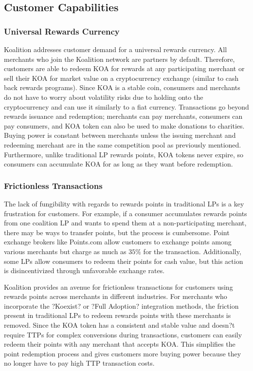 \subsection{Customer Capabilities}

\subsubsection{Universal Rewards Currency}
Koalition addresses customer demand for a universal rewards currency. All merchants who join the Koalition network are partners by default. Therefore, customers are able to redeem KOA for rewards at any participating merchant or sell their KOA for market value on a cryptocurrency exchange (similar to cash back rewards programs). Since KOA is a stable coin, consumers and merchants do not have to worry about volatility risks due to holding onto the cryptocurrency and can use it similarly to a fiat currency. Transactions go beyond rewards issuance and redemption; merchants can pay merchants, consumers can pay consumers, and KOA token can also be used to make donations to charities. Buying power is constant between merchants unless the issuing merchant and redeeming merchant are in the same competition pool as previously mentioned. Furthermore, unlike traditional LP rewards points, KOA tokens never expire, so consumers can accumulate KOA for as long as they want before redemption.

\subsubsection{Frictionless Transactions}
The lack of fungibility with regards to rewards points in traditional LPs is a key frustration for customers. For example, if a consumer accumulates rewards points from one coalition LP and wants to spend them at a non-participating merchant, there may be ways to transfer points, but the process is cumbersome. Point exchange brokers like Points.com allow customers to exchange points among various merchants but charge as much as $35\%$ for the transaction. Additionally, some LPs allow consumers to redeem their points for cash value, but this action is disincentivized through unfavorable exchange rates.

Koalition provides an avenue for frictionless transactions for customers using rewards points across merchants in different industries. For merchants who incorporate the ?Koexist? or ?Full Adoption? integration methods, the friction present in traditional LPs to redeem rewards points with these merchants is removed. Since the KOA token has a consistent and stable value and doesn?t require TTPs for complex conversions during transactions, customers can easily redeem their points with any merchant that accepts KOA. This simplifies the point redemption process and gives customers more buying power because they no longer have to pay high TTP transaction costs. 

